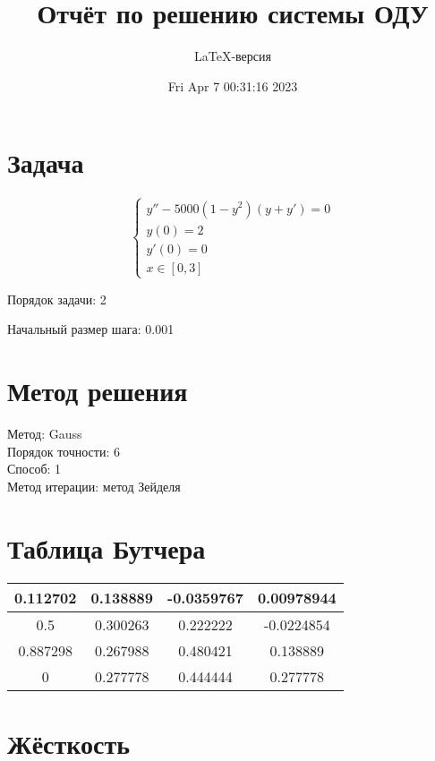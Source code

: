 \documentclass[a4paper,14pt]{extarticle}
\title{Отчёт по решению системы ОДУ}
\author{LaTeX-версия}
\date{Fri Apr  7 00:31:16 2023}
\begin{document}
\maketitle

\tableofcontents
\pagebreak

\section{Задача}

$$
\begin{cases}
	y'' - 5000(1 - y^{2})(y + y') = 0\\
	y(0) = 2\\
	y'(0) = 0\\
	x \in [0, 3]
\end{cases}
$$

Порядок задачи: 2

Начальный размер шага: 0.001

\section{Метод решения}

Метод: Gauss\\
Порядок точности: 6\\
Способ: 1\\
Метод итерации: метод Зейделя

\section{Таблица Бутчера}

\begin{table}[h]
\centering
\begin{tabular}{|c||c|c|c|}
\hline
0.112702 & 0.138889 & -0.0359767 & 0.00978944\\
\hline
0.5 & 0.300263 & 0.222222 & -0.0224854\\
\hline
0.887298 & 0.267988 & 0.480421 & 0.138889\\
\hline
0 & \cellcolor{lightgray} 0.277778 & \cellcolor{lightgray} 0.444444 & \cellcolor{lightgray} 0.277778\\
\hline
\end{tabular}
\end{table}

\section{Жёсткость}
\end{document}
